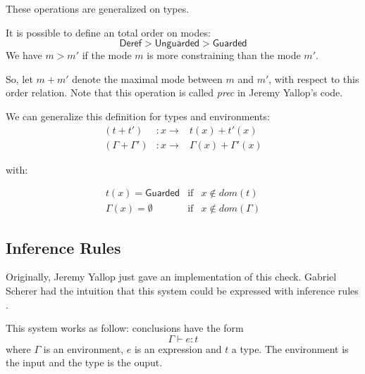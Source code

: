 \documentclass{article}
\newcommand{\Deref}{\mathsf{Deref}}
\newcommand{\Unguarded}{\mathsf{Unguarded}}
\newcommand{\Guarded}{\mathsf{Guarded}}
\begin{document}
These operations are generalized on types.

It is possible to define an total order on modes:
$$\Deref > \Unguarded > \Guarded$$
We have $m > m'$ if the mode $m$ is more constraining than the mode $m'$.

So, let $m + m'$ denote the maximal mode between $m$ and $m'$, with respect to
this order relation. Note that this operation is called \textit{prec} in
Jeremy Yallop's code.

We can generalize this definition for types and environments:
\begin{displaymath}
  \begin{array}{lll}
    (t + t')           & : x \rightarrow & t(x) + t'(x) \\
    (\Gamma + \Gamma') & : x \rightarrow & \Gamma(x) + \Gamma'(x)
  \end{array}
\end{displaymath}

with:

\begin{displaymath}
  \begin{array}{lll}
    t(x) = \Guarded       & \text{if} & x \notin dom(t) \\
    \Gamma(x) = \emptyset & \text{if} & x \notin dom(\Gamma)
  \end{array}
\end{displaymath}

\subsection{Inference Rules}
Originally, Jeremy Yallop just gave an implementation of this check. Gabriel
Scherer had the intuition that this system could be expressed with inference
rules \cite{GascheComment1, GascheComment2}.

This system works as follow: conclusions have the form
$$\Gamma \vdash e: t$$
where $\Gamma$ is an environment, $e$ is an expression and $t$ a type. The
environment is the input and the type is the ouput.
\end{document}
